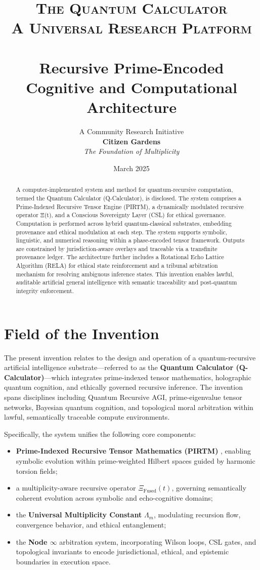 \documentclass[12pt]{article}
\title{\textsc{\Huge The Quantum Calculator \\ A Universal Research Platform} \\[0.5em] \\ Recursive Prime-Encoded Cognitive and Computational Architecture}
\author{A Community Research Initiative \\ \textbf{ Citizen Gardens} \\ \textit {The Foundation of Multiplicity}}
\date{March 2025}
\begin{document}
\maketitle
\begin{abstract}
A computer-implemented system and method for quantum-recursive computation, termed the Quantum Calculator (Q-Calculator), is disclosed. The system comprises a Prime-Indexed Recursive Tensor Engine (PIRTM), a dynamically modulated recursive operator Ξ(t), and a Conscious Sovereignty Layer (CSL) for ethical governance. Computation is performed across hybrid quantum-classical substrates, embedding provenance and ethical modulation at each step. The system supports symbolic, linguistic, and numerical reasoning within a phase-encoded tensor framework. Outputs are constrained by jurisdiction-aware overlays and traceable via a transfinite provenance ledger. The architecture further includes a Rotational Echo Lattice Algorithm (RELA) for ethical state reinforcement and a tribunal arbitration mechanism for resolving ambiguous inference states. This invention enables lawful, auditable artificial general intelligence with semantic traceability and post-quantum integrity enforcement.
\end{abstract}
\newpage


\section*{Field of the Invention}

The present invention relates to the design and operation of a quantum-recursive artificial intelligence substrate—referred to as the \textbf{Quantum Calculator (Q-Calculator)}—which integrates prime-indexed tensor mathematics, holographic quantum cognition, and ethically governed recursive inference. The invention spans disciplines including Quantum Recursive AGI, prime-eigenvalue tensor networks, Bayesian quantum cognition, and topological moral arbitration within lawful, semantically traceable compute environments.

Specifically, the system unifies the following core components:

\begin{itemize}
    \item \textbf{Prime-Indexed Recursive Tensor Mathematics (PIRTM)} \cite{multiplicity2025, extensions2025}, enabling symbolic evolution within prime-weighted Hilbert spaces guided by harmonic torsion fields;
    \item a multiplicity-aware recursive operator \( \Xi_{\text{Fused}}(t) \), governing semantically coherent evolution across symbolic and echo-cognitive domains;
    \item the \textbf{Universal Multiplicity Constant} \( \Lambda_m \), modulating recursion flow, convergence behavior, and ethical entanglement;
    \item the \textbf{Node \( \infty \)} arbitration system, incorporating Wilson loops, CSL gates, and topological invariants to encode jurisdictional, ethical, and epistemic boundaries in execution space.
\end{itemize}
\end{document}
